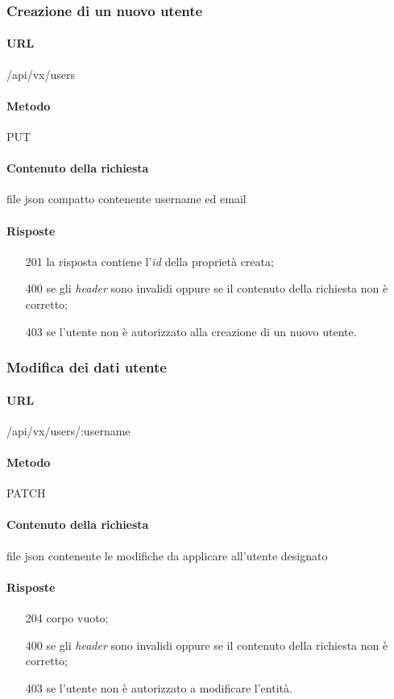 \subsubsection{Creazione di un nuovo utente}
\paragraph{URL}
/api/vx/users
\paragraph{Metodo}
PUT
\paragraph{Contenuto della richiesta}
file \gls{json} compatto contenente username ed email
\paragraph{Risposte}
\begin{itemize}
	\item[201] la risposta contiene l'\emph{id} della proprietà creata;
	\item[400] se gli \emph{header} sono invalidi oppure se il contenuto della richiesta non è corretto;
	\item[403] se l'utente non è autorizzato alla creazione di un nuovo utente.
\end{itemize}

\subsubsection{Modifica dei dati utente}
\paragraph{URL}
/api/vx/users/:username
\paragraph{Metodo}
PATCH
\paragraph{Contenuto della richiesta}
file \gls{json} contenente le modifiche da applicare all'utente designato
\paragraph{Risposte}
\begin{itemize}
	\item[204] corpo vuoto;
	\item[400] se gli \emph{header} sono invalidi oppure se il contenuto della richiesta non è corretto;
	\item[403] se l'utente non è autorizzato a modificare l'entità.
\end{itemize}

